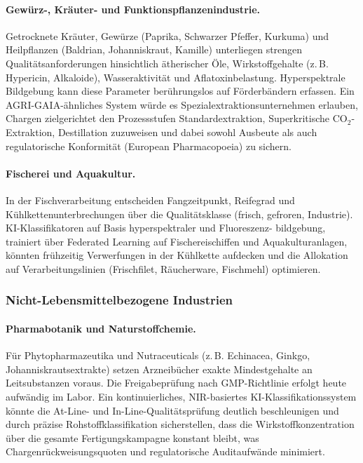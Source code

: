 \documentclass[a4paper, 12pt, twoside, openright]{report}
\theoremstyle{definition}
\theoremstyle{definition}
\begin{document}
\paragraph{Gewürz-, Kräuter- und Funktionspflanzenindustrie.}
Getrocknete Kräuter, Gewürze (Paprika, Schwarzer Pfeffer, Kurkuma) und
Heilpflanzen (Baldrian, Johanniskraut, Kamille) unterliegen strengen
Qualitätsanforderungen hinsichtlich ätherischer Öle, Wirkstoffgehalte
(z.\,B. Hypericin, Alkaloide), Wasseraktivität und Aflatoxinbelastung.
Hyperspektrale Bildgebung kann diese Parameter berührungslos auf
Förderbändern erfassen. Ein AGRI-GAIA-ähnliches System würde es
Spezialextraktionsunternehmen erlauben, Chargen zielgerichtet den
Prozessstufen Standardextraktion, Superkritische CO$_2$-Extraktion,
Destillation zuzuweisen und dabei sowohl Ausbeute als auch regulatorische
Konformität (European Pharmacopoeia) zu sichern.

\paragraph{Fischerei und Aquakultur.}
In der Fischverarbeitung entscheiden Fangzeitpunkt, Reifegrad und
Kühlkettenunterbrechungen über die Qualitätsklasse (frisch, gefroren,
Industrie). KI-Klassifikatoren auf Basis hyperspektraler und Fluoreszenz-
bildgebung, trainiert über Federated Learning auf Fischereischiffen und
Aquakulturanlagen, könnten frühzeitig Verwerfungen in der
Kühlkette aufdecken und die Allokation auf Verarbeitungslinien
(Frischfilet, Räucherware, Fischmehl) optimieren.

\subsubsection{Nicht-Lebensmittelbezogene Industrien}

\paragraph{Pharmabotanik und Naturstoffchemie.}
Für Phytopharmazeutika und Nutraceuticals (z.\,B. Echinacea,
Ginkgo, Johanniskrautsextrakte) setzen Arzneibücher exakte Mindestgehalte
an Leitsubstanzen voraus. Die Freigabeprüfung nach GMP-Richtlinie erfolgt
heute aufwändig im Labor. Ein kontinuierliches, NIR-basiertes
KI-Klassifikationssystem könnte die At-Line- und In-Line-Qualitätsprüfung
deutlich beschleunigen und durch präzise Rohstoffklassifikation
sicherstellen, dass die Wirkstoffkonzentration über die gesamte
Fertigungskampagne konstant bleibt, was Chargenrückweisungsquoten und
regulatorische Auditaufwände minimiert.
\end{document}

